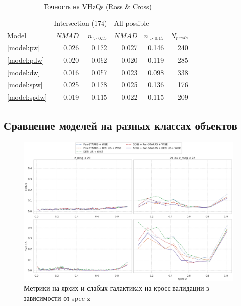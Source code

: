 \documentclass[fleqn,usenatbib]{mnras}
\begin{document}
\begin{table}
	\begin{tabular}{lrrrrr}
            \hline
            {} & \multicolumn{2}{l}{Intersection (174)} & \multicolumn{3}{l}{All possible} \\
            Model &             $NMAD$ & $n_{>0.15}$ &       $NMAD$ & $n_{>0.15}$ & $N_{preds}$ \\
            \hline
            \ref{model:pw}   &              0.026 &       0.132 &        0.027 &       0.146 &         240 \\
            \ref{model:pdw}  &              0.020 &       0.092 &        0.020 &       0.119 &         285 \\
            \ref{model:dw}   &              0.016 &       0.057 &        0.023 &       0.098 &         338 \\
            \ref{model:spw}  &              0.025 &       0.138 &        0.025 &       0.136 &         176 \\
            \ref{model:spdw} &              0.019 &       0.115 &        0.022 &       0.115 &         209 \\
            \hline
            \end{tabular}
            \caption{Точность на VHzQs (Ross \& Cross)}
\end{table}


\subsection{Сравнение моделей на разных классах объектов}
\begin{figure}
    \centering
    \includegraphics[width=0.9\linewidth]{images/class-galaxy-cv2.png}
    \caption{Метрики на ярких и слабых галактиках на кросс-валидации в зависимости от spec-z}
    \label{fig:class-galaxy-cv2}
\end{figure}
\end{document}
